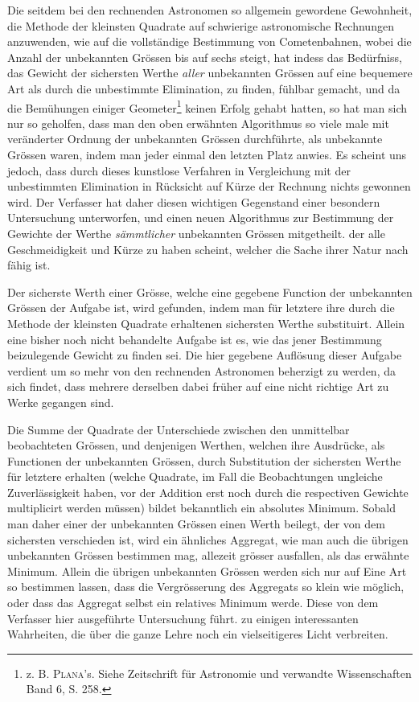 Die seitdem bei den rechnenden Astronomen so allgemein gewordene Gewohnheit, die Methode der kleinsten Quadrate auf schwierige astronomische Rechnungen anzuwenden, wie auf die vollständige Bestimmung von Cometenbahnen, wobei die Anzahl der unbekannten Grössen bis auf sechs steigt, hat indess das Bedürfniss, das Gewicht der sichersten Werthe \textit{aller} unbekannten Grössen auf
eine bequemere Art als durch die unbestimmte Elimination, zu finden, fühlbar gemacht, und da die Bemühungen einiger Geometer\footnote{z. B. \textsc{Plana}'s. Siehe Zeitschrift für Astronomie und verwandte Wissenschaften Band 6, S. 258.} keinen Erfolg gehabt hatten, so hat man sich nur so geholfen, dass man den oben erwähnten Algorithmus so viele male mit veränderter Ordnung der unbekannten Grössen durchführte, als unbekannte Grössen waren, indem man jeder einmal den letzten Platz anwies. Es scheint uns jedoch, dass durch dieses kunstlose Verfahren in Vergleichung mit der unbestimmten Elimination in Rücksicht auf Kürze der Rechnung nichts gewonnen wird. Der Verfasser hat daher diesen wichtigen Gegenstand einer besondern Untersuchung unterworfen, und einen neuen Algorithmus zur Bestimmung der Gewichte der Werthe \textit{sämmtlicher} unbekannten Grössen mitgetheilt. der alle Geschmeidigkeit und Kürze zu haben scheint, welcher die Sache ihrer Natur nach fähig ist.

Der sicherste Werth einer Grösse, welche eine gegebene Function der unbekannten Grössen der Aufgabe ist, wird gefunden, indem man für letztere ihre durch die Methode der kleinsten Quadrate erhaltenen sichersten Werthe substituirt. Allein eine bisher noch nicht behandelte Aufgabe ist es, wie das jener Bestimmung beizulegende Gewicht zu finden sei. Die hier gegebene Auflösung dieser Aufgabe verdient um so mehr von den rechnenden Astronomen beherzigt zu werden, da sich findet, dass mehrere derselben dabei früher auf eine nicht richtige Art zu Werke gegangen sind.

Die Summe der Quadrate der Unterschiede zwischen den unmittelbar beobachteten Grössen, und denjenigen Werthen, welchen ihre Ausdrücke, als Functionen der unbekannten Grössen, durch Substitution der sichersten Werthe für letztere erhalten (welche Quadrate, im Fall die Beobachtungen ungleiche Zuverlässigkeit haben, vor der Addition erst noch durch die respectiven Gewichte multiplicirt werden müssen) bildet bekanntlich ein absolutes Minimum. Sobald man daher einer der unbekannten Grössen einen Werth beilegt, der von dem sichersten verschieden ist, wird ein ähnliches Aggregat, wie man auch die übrigen unbekannten Grössen bestimmen mag, allezeit grösser ausfallen, als das erwähnte Minimum. Allein die übrigen unbekannten Grössen werden sich nur auf Eine Art so bestimmen lassen, dass die Vergrösserung des Aggregats so klein wie möglich, oder dass das Aggregat selbst ein relatives Minimum werde. Diese von dem Verfasser hier ausgeführte Untersuchung führt. zu einigen interessanten Wahrheiten, die über die ganze Lehre noch ein vielseitigeres Licht verbreiten.

